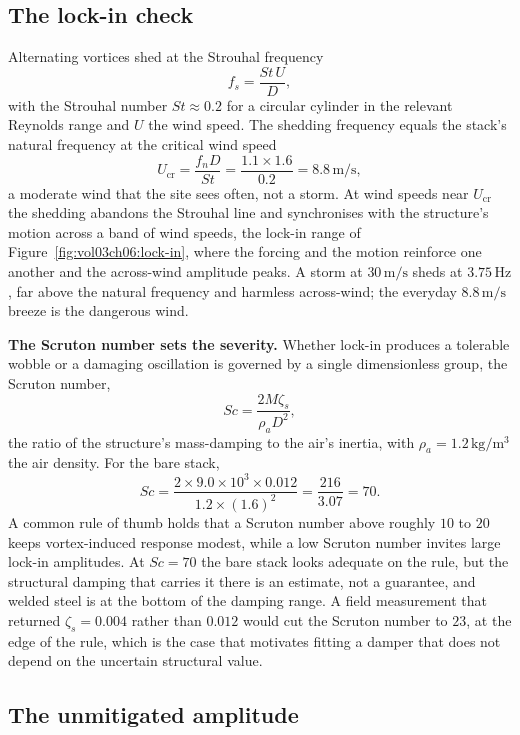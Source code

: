 \subsection{The lock-in check}

Alternating vortices shed at the Strouhal frequency
\[
f_s = \frac{\mathit{St}\,U}{D},
\]
with the Strouhal number $\mathit{St}\approx 0.2$ for a circular
cylinder in the relevant Reynolds range and $U$ the wind speed. The
shedding frequency equals the stack's natural frequency at the critical
wind speed
\[
U_{\text{cr}} = \frac{f_n D}{\mathit{St}} = \frac{1.1\times 1.6}{0.2} =
8.8\,\si{\meter\per\second},
\]
a moderate wind that the site sees often, not a storm. At wind speeds
near $U_{\text{cr}}$ the shedding abandons the Strouhal line and
synchronises with the structure's motion across a band of wind speeds,
the lock-in range of Figure~\ref{fig:vol03ch06:lock-in}, where the
forcing and the motion reinforce one another and the across-wind
amplitude peaks. A storm at $30\,\si{\meter\per\second}$ sheds at $3.75\,
\si{\hertz}$, far above the natural frequency and harmless across-wind;
the everyday $8.8\,\si{\meter\per\second}$ breeze is the dangerous wind.



\textbf{The Scruton number sets the severity.} Whether lock-in produces
a tolerable wobble or a damaging oscillation is governed by a single
dimensionless group, the Scruton number,
\[
\mathit{Sc} = \frac{2 M \zeta_s}{\rho_a D^2},
\]
the ratio of the structure's mass-damping to the air's inertia, with
$\rho_a = 1.2\,\si{\kilogram\per\meter\cubed}$ the air density. For the
bare stack,
\[
\mathit{Sc} = \frac{2\times 9.0\times 10^3\times 0.012}{1.2\times
(1.6)^2} = \frac{216}{3.07} = 70.
\]
A common rule of thumb holds that a Scruton number above roughly $10$ to
$20$ keeps vortex-induced response modest, while a low Scruton number
invites large lock-in amplitudes. At $\mathit{Sc} = 70$ the bare stack
looks adequate on the rule, but the structural damping that carries it
there is an estimate, not a guarantee, and welded steel is at the bottom
of the damping range. A field measurement that returned $\zeta_s =
0.004$ rather than $0.012$ would cut the Scruton number to $23$, at the
edge of the rule, which is the case that motivates fitting a damper that
does not depend on the uncertain structural value.

\subsection{The unmitigated amplitude}

